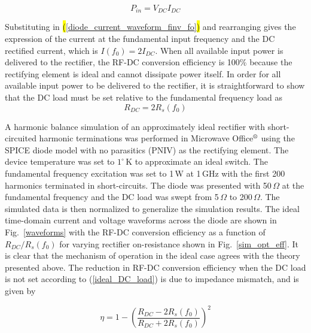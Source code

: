 \begin{equation}\label{dcload}
P_{in} = V_{DC}I_{DC}
\end{equation}

Substituting in \hl{(}\ref{diode_current_waveform_finv_fo}\hl{)} and rearranging gives the expression of the current at the fundamental input frequency and the DC rectified current, which is $I(f_0) = 2I_{DC}$. When all available input power is delivered to the rectifier, the RF-DC conversion efficiency is 100\% because the rectifying element is ideal and cannot dissipate power itself.  In order for all available input power to be delivered to the rectifier, it is straightforward to show that the DC load must be set relative to the fundamental frequency load as
\begin{equation}\label{ideal_DC_load}
R_{DC} = 2R_s(f_0)
\end{equation}

A harmonic balance simulation of an approximately ideal rectifier with short-circuited harmonic terminations was performed in Microwave Office$\textsuperscript{\textregistered}$ using the SPICE diode model with no parasitics (PNIV) as the rectifying element.  The device temperature was set to $1^\circ$\,K to approximate an ideal switch.  The fundamental frequency excitation was set to 1\,W at 1\,GHz with the first 200 harmonics terminated in short-circuits.  The diode was presented with 50\,$\Omega$ at the fundamental frequency and the DC load was swept from 5\,$\Omega$ to 200\,$\Omega$.  The simulated data is then normalized to generalize the simulation results. The ideal time-domain current and voltage waveforms across the diode are shown in Fig.~\ref{waveforms} with the RF-DC conversion efficiency as a function of $R_{DC} / R_s(f_0)$ for varying rectifier on-resistance shown in Fig.~\ref{sim_opt_eff}.  It is clear that the mechanism of operation in the ideal case agrees with the theory presented above.  The reduction in RF-DC conversion efficiency when the DC load is not set according to (\ref{ideal_DC_load}) is due to impedance mismatch, and is given by


\begin{equation}\label{eff_dc_load}
\eta = 1 - \left(\frac{R_{DC} - 2R_s(f_0)}{R_{DC} + 2R_s(f_0)}\right)^2
\end{equation}

